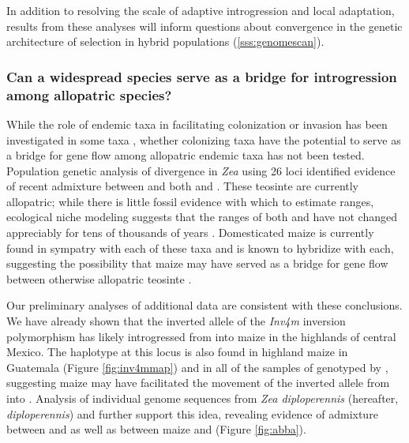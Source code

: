 In addition to resolving the scale of adaptive introgression and local adaptation, results from these analyses will inform questions about convergence in the genetic architecture of selection in hybrid populations (\ref{sss:genomescan}).

\subsubsection{Can a widespread species serve as a bridge for introgression among allopatric species?}
\label{sss:bridge}

While the role of endemic taxa in facilitating colonization or invasion has been investigated in some taxa \citep{Bock2015}, whether colonizing taxa have the potential to serve as a bridge for gene flow among allopatric endemic taxa has not been tested. 
Population genetic analysis of divergence in \emph{Zea} using 26 loci identified evidence of recent admixture between \zl{} and both \zp{} and \zm{} \citep{Ross-Ibarra2009a}. 
These teosinte are currently allopatric; while there is little fossil evidence with which to estimate ranges, ecological niche modeling suggests that the ranges of both \zp{} and \zm{} have not changed appreciably for tens of thousands of years \citep{hufford2012inferences}.  
Domesticated maize is currently found in sympatry with each of these taxa and is known to hybridize with each, suggesting the possibility that maize may have served as a bridge for gene flow between otherwise allopatric teosinte \citep{Ross-Ibarra2009a}.

Our preliminary analyses of additional data are consistent with these conclusions.
We have already shown that the inverted allele of the \emph{Inv4m} inversion polymorphism has likely introgressed from \zm{} into maize in the highlands of central Mexico.  
The \zm{} haplotype at this locus is also found in highland maize in Guatemala (Figure \ref{fig:inv4mmap}) and in all of the samples of \zm{} genotyped by \citet{Fang2012}, suggesting maize may have facilitated the movement of the inverted allele from \zm{} into \zl{}.
Analysis of individual genome sequences from \emph{Zea diploperennis} (hereafter, \emph{diploperennis}) and \zl{} \citep{tenaillon2011genome} further support this idea, revealing evidence of admixture between \zp{} and \zl{} as well as between maize and \zd{} (Figure \ref{fig:abba}).

